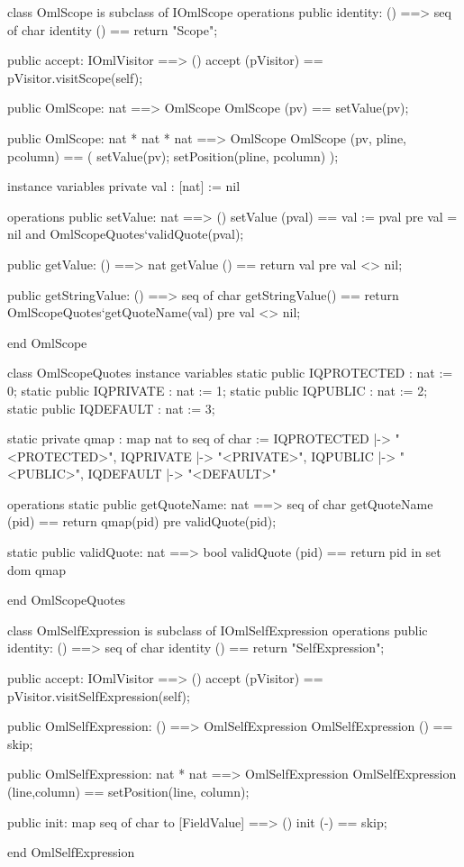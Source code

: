 \begin{vdm_al}
class OmlScope is subclass of IOmlScope
operations
  public identity: () ==> seq of char
  identity () == return "Scope";

  public accept: IOmlVisitor ==> ()
  accept (pVisitor) == pVisitor.visitScope(self);

  public OmlScope: nat ==> OmlScope
  OmlScope (pv) == setValue(pv);

  public OmlScope: nat * nat * nat ==> OmlScope
  OmlScope (pv, pline, pcolumn) == ( setValue(pv); setPosition(pline, pcolumn) );

instance variables
  private val : [nat] := nil

operations
  public setValue: nat ==> ()
  setValue (pval) == val := pval
    pre val = nil and OmlScopeQuotes`validQuote(pval);

  public getValue: () ==> nat
  getValue () == return val
    pre val <> nil;

  public getStringValue: () ==> seq of char
  getStringValue() == return OmlScopeQuotes`getQuoteName(val)
    pre val <> nil;

end OmlScope
\end{vdm_al}
\begin{vdm_al}
class OmlScopeQuotes
instance variables
  static public IQPROTECTED : nat := 0;
  static public IQPRIVATE : nat := 1;
  static public IQPUBLIC : nat := 2;
  static public IQDEFAULT : nat := 3;

  static private qmap : map nat to seq of char :=
    { IQPROTECTED |-> "<PROTECTED>",
      IQPRIVATE |-> "<PRIVATE>",
      IQPUBLIC |-> "<PUBLIC>",
      IQDEFAULT |-> "<DEFAULT>" }

operations
  static public getQuoteName: nat ==> seq of char
  getQuoteName (pid) ==
    return qmap(pid)
    pre validQuote(pid);

  static public validQuote: nat ==> bool
  validQuote (pid) == return pid in set dom qmap

end OmlScopeQuotes
\end{vdm_al}
\begin{vdm_al}
class OmlSelfExpression is subclass of IOmlSelfExpression
operations
  public identity: () ==> seq of char
  identity () == return "SelfExpression";

  public accept: IOmlVisitor ==> ()
  accept (pVisitor) == pVisitor.visitSelfExpression(self);

  public OmlSelfExpression:
    () ==> OmlSelfExpression
  OmlSelfExpression () == 
    skip;

  public OmlSelfExpression:
    nat *
    nat ==> OmlSelfExpression
  OmlSelfExpression (line,column) == 
    setPosition(line, column);

  public init: map seq of char to [FieldValue] ==> ()
  init (-) == skip;

end OmlSelfExpression
\end{vdm_al}

